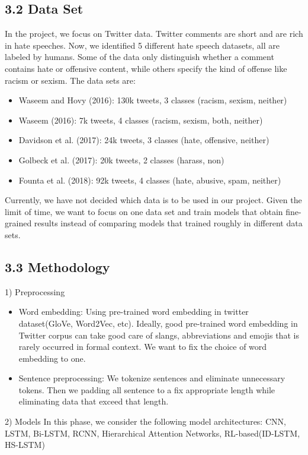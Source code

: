 \documentclass[10pt]{article}
\begin{document}
\subsection*{3.2 Data Set}
In the project, we focus on Twitter data. Twitter comments are short and are rich in hate speeches. Now, we identified 5 different hate speech datasets, all are labeled by humans. Some of the data only distinguish whether a comment contains hate or offensive content, while others specify the kind of offense like racism or sexism. The data sets are:
\begin{itemize}
  \item \cite{}Waseem and Hovy (2016): 130k tweets, 3 classes (racism, sexism, neither)
  \item \cite{}Waseem (2016): 7k tweets, 4 classes (racism, sexism, both, neither)
  \item \cite{}Davidson et al. (2017): 24k tweets, 3 classes (hate, offensive, neither)
  \item \cite{}Golbeck et al. (2017): 20k tweets, 2 classes (harass, non)
  \item \cite{}Founta et al. (2018): 92k tweets, 4 classes (hate, abusive, spam, neither)
\end{itemize}

Currently, we have not decided which data is to be used in our project. Given the limit of time, we want to focus on one data set and train models that obtain fine-grained results instead of comparing models that trained roughly in different data sets.

\subsection*{3.3 Methodology}
1) Preprocessing
\begin{itemize}
  \item Word embedding: Using pre-trained word embedding in twitter dataset(GloVe, Word2Vec, etc). Ideally, good pre-trained word embedding in Twitter corpus can take good care of slangs, abbreviations and emojis that is rarely occurred in formal context. We want to fix the choice of word embedding to one.
  \item Sentence preprocessing: We tokenize sentences and eliminate unnecessary tokens. Then we padding all sentence to a fix appropriate length while eliminating data that exceed that length.
\end{itemize}
2) Models
In this phase, we consider the following model architectures: CNN, LSTM, Bi-LSTM, RCNN, Hierarchical Attention Networks, RL-based(ID-LSTM, HS-LSTM)
\end{document}
